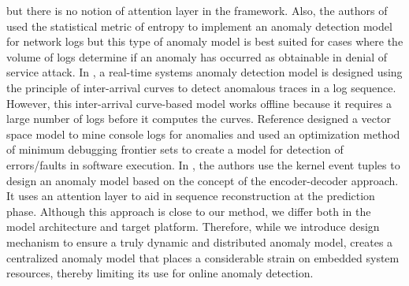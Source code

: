 but there is no notion of attention layer in the framework. Also, the authors 
of \cite{gu2005detecting} used the statistical metric of entropy to implement 
an anomaly detection model for network logs but this type of anomaly model is 
best suited for cases where the volume of logs determine if an anomaly has 
occurred as obtainable in denial of service attack. In 
\cite{salem2016anomaly}, a real-time systems anomaly detection model is 
designed using the principle of inter-arrival curves to detect anomalous traces 
in a log sequence. However, this inter-arrival curve-based model works offline 
because it requires a large number of logs before it computes the curves. 
Reference \cite{xu2009largescale} designed a vector space model to mine console 
logs for anomalies and \cite{li2017locating} used an optimization method of 
minimum debugging frontier sets to create a model for detection of 
errors/faults in software execution. In \cite{Ezeme2018RTCSA}, the authors use 
the kernel event tuples to design an anomaly model based on the concept of the 
encoder-decoder approach. It uses an attention layer to aid in sequence 
reconstruction at the prediction phase. Although this approach is close to our 
method, we differ both in the model architecture and target platform. 
Therefore, while we introduce design mechanism to ensure a truly dynamic and 
distributed anomaly model, \cite{Ezeme2018RTCSA} creates a centralized anomaly 
model that places a considerable strain on embedded system resources, thereby 
limiting its use for online anomaly detection.

